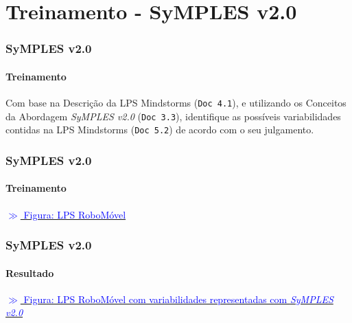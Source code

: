 \section{Treinamento - SyMPLES v2.0}

\begin{frame}
\frametitle{SyMPLES v2.0}
\framesubtitle{Treinamento}

  Com base na Descrição da LPS Mindstorms (\texttt{Doc 4.1}), e utilizando os Conceitos da Abordagem \textit{SyMPLES v2.0} (\texttt{Doc 3.3}), identifique as possíveis variabilidades contidas na LPS Mindstorms (\texttt{Doc 5.2}) de acordo com o seu julgamento.
  
\end{frame}

\begin{frame}
\frametitle{SyMPLES v2.0}
\framesubtitle{Treinamento}
  
  \href{run:./material/roboMovel-blocks.pdf}{\textcolor{blue}{$\gg$ Figura: LPS RoboMóvel}}

\end{frame}

\begin{frame}
\frametitle{SyMPLES v2.0}
\framesubtitle{Resultado}

  \href{run:./material/roboMovel-blocks-cvl.pdf}{\textcolor{blue}{$\gg$ Figura: LPS RoboMóvel com variabilidades representadas com \textit{SyMPLES v2.0}}}

\end{frame}